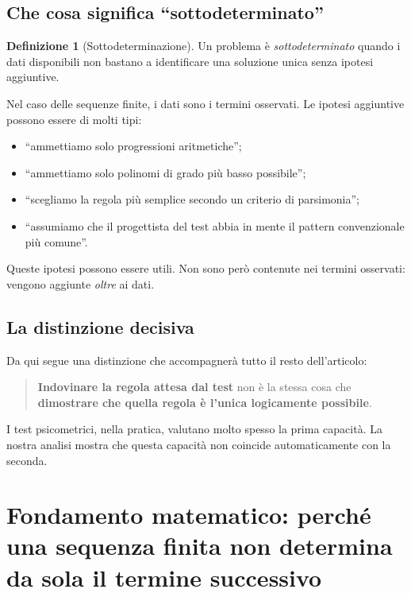 \documentclass[10pt, a4paper]{article}
\theoremstyle{plain}
\theoremstyle{definition}
\newtheorem{definition}{Definizione}
\theoremstyle{remark}
\begin{document}
\subsection{Che cosa significa ``sottodeterminato''}

\begin{definition}[Sottodeterminazione]
Un problema è \emph{sottodeterminato} quando i dati disponibili non bastano a
identificare una soluzione unica senza ipotesi aggiuntive.
\end{definition}

Nel caso delle sequenze finite, i dati sono i termini osservati. Le ipotesi
aggiuntive possono essere di molti tipi:
\begin{itemize}
    \item ``ammettiamo solo progressioni aritmetiche'';
    \item ``ammettiamo solo polinomi di grado più basso possibile'';
    \item ``scegliamo la regola più semplice secondo un criterio di
          parsimonia'';
    \item ``assumiamo che il progettista del test abbia in mente il pattern
          convenzionale più comune''.
\end{itemize}

Queste ipotesi possono essere utili. Non sono però contenute nei termini
osservati: vengono aggiunte \emph{oltre} ai dati.

\subsection{La distinzione decisiva}

Da qui segue una distinzione che accompagnerà tutto il resto dell'articolo:

\begin{quote}
\textbf{Indovinare la regola attesa dal test} non è la stessa cosa che
\textbf{dimostrare che quella regola è l'unica logicamente possibile}.
\end{quote}

I test psicometrici, nella pratica, valutano molto spesso la prima capacità.
La nostra analisi mostra che questa capacità non coincide automaticamente con
la seconda.

\section{Fondamento matematico: perché una sequenza finita non determina da sola il termine successivo}
\label{sec:math}
\end{document}
